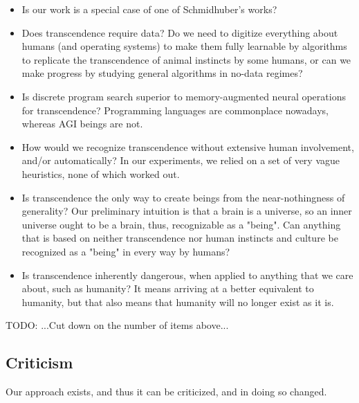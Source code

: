 \documentclass{article}
\begin{document}
\begin{itemize}
\item Is our work is a special case of one of Schmidhuber's works?

\item Does transcendence require data? Do we need to digitize everything about humans (and operating systems) to make them fully learnable by algorithms to replicate the transcendence of animal instincts by some humans, or can we make progress by studying general algorithms in no-data regimes?

\item Is discrete program search superior to memory-augmented neural operations for transcendence? Programming languages are commonplace nowadays, whereas AGI beings are not.

\item How would we recognize transcendence without extensive human involvement, and/or automatically? In our experiments, we relied on a set of very vague heuristics, none of which worked out.

\item Is transcendence the only way to create beings from the near-nothingness of generality? Our preliminary intuition is that a brain is a universe, so an inner universe ought to be a brain, thus, recognizable as a "being". Can anything that is based on neither transcendence nor human instincts and culture be recognized as a "being" in every way by humans?

\item Is transcendence inherently dangerous, when applied to anything that we care about, such as humanity? It means arriving at a better equivalent to humanity, but that also means that humanity will no longer exist as it is.
\end{itemize}

    TODO: ...Cut down on the number of items above...

\subsection{Criticism}

Our approach exists, and thus it can be criticized, and in doing so changed.
\end{document}
